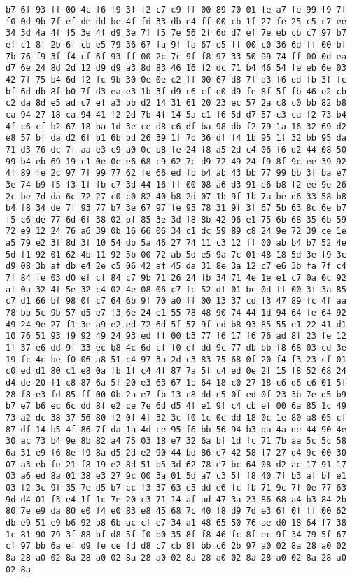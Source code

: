 \documentclass{article}
\begin{document}
\begin{verbatim}
b7 6f 93 ff 00 4c f6 f9 3f f2 c7 c9 ff 00 89 70 01 fe a7 fe 99 f9 7f f0 0d 9b 7f ef de dd be 4f fd 33 db e4 ff 00 cb 1f 27 fe 25 c5 c7 ee 34 3d 4a 4f f5 3e 4f d9 3e 7f f5 7e 56 2f 6d d7 ef 7e eb cb c7 97 b7 ef c1 8f 2b 6f cb e5 79 36 67 fa 9f fa 67 e5 ff 00 c0 36 6d ff 00 bf 7b 76 f9 3f f4 cf 6f 93 ff 00 2c 7c 9f f8 97 33 50 99 74 ff 00 0d ea d7 6e 24 8d 2d 12 d9 d9 a3 8d 83 46 16 f2 dc 71 b4 46 54 fe eb 6e 03 42 7f 75 b4 6d f2 fc 9b 30 0e 0e c2 ff 00 67 d8 7f d3 f6 ed fb 3f fc bf 6d db 8f b0 7f d3 ea e3 1b 3f d9 c6 cf e0 d9 fe 8f 5f fb 46 e2 cb c2 da 8d e5 ad c7 ef a3 bb d2 14 31 61 20 23 ec 57 2a c8 c0 bb 82 b8 ca 94 27 18 ca 94 41 f2 2d 7b 4f 14 5a c1 f6 5d d7 57 c3 ca f2 73 b4 4f c6 cf b2 67 18 ba 1d 3e ce d8 c6 df ba 98 db f2 79 1a 16 32 69 d2 e8 57 bf da d2 6f b1 6b bd 26 39 1f 7b 36 df f4 1b 95 1f 32 bb 95 da 71 d3 76 dc 7f aa e3 c9 a0 0c b8 fe 24 f8 a5 2d c4 06 f6 d2 44 08 50 99 b4 eb 69 19 c1 0e 0e e6 68 c9 62 7c d9 72 49 24 f9 8f 9c ee 39 92 4f 89 fe 2c 97 7f 99 77 62 fe 66 ed fb b4 ab 43 bb 77 99 bb 3f ba e7 3e 74 b9 f5 f3 1f fb c7 3d 44 16 ff 00 08 a6 d3 91 e6 b8 f2 ee 9e 26 2c be 7d da 6c 72 27 c0 c0 82 40 b8 2d 07 1b 9f 1b 7a be d6 33 58 b8 b4 f8 34 de 7f 93 77 b7 3e 67 97 fe 95 78 31 9f 3f 67 5b 63 8c 6e b7 f5 c6 de 77 6d 6f 38 02 bf 85 3e 3d f8 8b 42 96 e1 75 6b 68 35 6b 59 72 e9 12 24 76 a6 39 0b 16 66 06 34 c1 dc 59 89 c8 24 9e 72 39 ce 1e a5 79 e2 3f 8d 3f 10 54 db 5a 46 27 74 11 c3 12 ff 00 ab b4 b7 52 4e 5d f1 92 01 62 4b 11 92 5b 00 72 ab 5d e5 9a 7c 01 48 18 5d 3e f9 3c d9 08 3b af db e4 2e c5 06 42 af 45 da 31 8e 3a 12 c7 e6 3b fa 7f c4 7f 84 fe 03 d0 ef cf 84 c7 9b 71 26 24 fb 34 71 4e 1e e1 c7 0a 0c 92 af 0a 32 4f 5e 32 c4 02 4e 08 06 c7 fc 52 df 01 bc 0d ff 00 3f 3a 85 c7 d1 66 bf 98 0f c7 64 6b 9f 70 a0 ff 00 13 37 cd f3 47 89 fc 4f aa 78 bb 5c 9b 57 d5 e7 f3 6e 24 e1 55 78 48 90 74 44 1d 94 64 fe 64 92 49 24 9e 27 f1 3e a9 e2 ed 72 6d 5f 57 9f cd b8 93 85 55 e1 22 41 d1 10 76 51 93 f9 92 49 24 93 ed ff 00 b3 77 f6 17 f6 76 ad 8f 23 fe 12 1f 37 e6 dd 9f 33 ec b8 4c 6d cf f0 ef dd 9c 77 db bb f8 68 03 cd 3e 19 fc 4c be f0 06 a8 51 c4 97 3a 2d c3 83 75 68 0f 20 f4 f3 23 cf 01 c0 ed d1 80 c1 e8 0a fb 1f c4 4f 87 7a 5f c4 ed 0e 2f 15 f8 52 68 24 d4 de 20 f1 c8 87 6a 5f 20 e3 63 67 1b 64 18 c0 27 18 c6 d6 c6 01 5f 28 f8 e3 fd 85 ff 00 0b 2a e7 fb 13 c8 dd e5 0f ed 0f 23 3b 7e d5 b9 b7 e7 b6 ec 6c dd 8f e2 ce 7e 6d d5 4f e1 9f c4 cb ef 00 6a 85 1c 49 73 a2 dc 38 37 56 80 f2 0f 4f 32 3c f0 1c 0e dd 18 0c 1e 80 a8 05 cf 87 df 14 b5 4f 86 7f da 1a 4d ce 95 f6 bb 56 94 b3 da 4a de 44 90 4e 30 ac 73 b4 9e 8b 82 a4 75 03 18 e7 32 6a bf 1d fc 71 7b aa 5c 5c 58 6a 31 e9 f6 8e f9 8a d5 2d e2 90 44 bd 86 e7 42 58 f7 27 d4 9c 00 30 07 a3 eb fe 21 f8 19 e2 8d 51 b5 3d 62 78 e7 bc 64 08 d2 ac 17 91 17 03 a6 ed 8a 01 38 e3 27 9c 00 3a 01 5d a7 c3 5f f8 40 7f b3 af bf e1 03 f2 3c 9f 35 7e d5 b7 cc f3 37 63 e5 dd e6 fc fb 71 9c 7f 0e 77 63 9d d4 01 f3 e4 1f 1c 7e 20 c3 71 14 af ad 47 3a 23 86 68 a4 b3 84 2b 80 7e e9 da 80 e0 f4 e0 83 e8 45 68 7c 40 f8 d9 7d e3 6f 0f ff 00 62 db e9 51 e9 b6 92 b8 6b ac cf e7 34 a1 48 65 50 76 ae d0 18 64 f7 38 1c 81 90 79 3f 88 bf d8 5f f0 b0 35 8f f8 46 fc 8f ec 9f 34 79 5f 67 cf 97 bb 6a ef d9 fe ce fd d8 c7 cb 8f bb c6 2b 97 a0 02 8a 28 a0 02 8a 28 a0 02 8a 28 a0 02 8a 28 a0 02 8a 28 a0 02 8a 28 a0 02 8a 28 a0 02 8a 
\end{verbatim}
\end{document}
